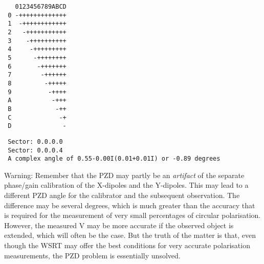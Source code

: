\spend %
%
\spbegin %
\sdefault{= *:}
\suser{\scr}
\svbegin \begin{verbatim}
   0123456789ABCD
 0 -+++++++++++++
 1  -++++++++++++
 2   -+++++++++++
 3    -++++++++++
 4     -+++++++++
 5      -++++++++
 6       -+++++++
 7        -++++++
 8         -+++++
 9          -++++
 A           -+++
 B            -++
 C             -+
 D              -
\end{verbatim}\svend
\spend %
%
\spbegin %
\suser{\scr}
\svbegin \begin{verbatim}
 Sector: 0.0.0.0
 Sector: 0.0.0.4
 A complex angle of 0.55-0.00I(0.01+0.01I) or -0.89 degrees
\end{verbatim}\svend
\spend %

Warning: Remember that the PZD may partly be an {\em artifact} of the separate
phase/gain calibration of the X-dipoles and the Y-dipoles. This may lead to a
different PZD angle for the calibrator and the subsequent observation. The
difference may be several degrees, which is much greater than the accuracy that
is required for the measurement of very small percentages of circular
polarisation. However, the measured V may be more accurate if the observed
object is extended, which will often be the case. But the truth of the matter
is that, even though the WSRT may offer the best conditions for very accurate
polarisation measurements, the PZD problem is essentially unsolved.

